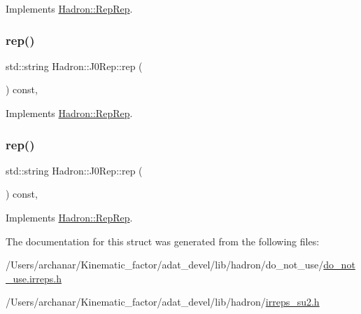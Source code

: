 Implements \mbox{\hyperlink{structHadron_1_1RepRep_ab3213025f6de249f7095892109575fde}{Hadron\+::\+Rep\+Rep}}.

\mbox{\label{structHadron_1_1J0Rep_a357214188122dd0e69716a4f7ff098b1}} 
\subsubsection{\texorpdfstring{rep()}{rep()}\hspace{0.1cm}{\footnotesize\ttfamily [2/3]}}
{\footnotesize\ttfamily std\+::string Hadron\+::\+J0\+Rep\+::rep (\begin{DoxyParamCaption}{ }\end{DoxyParamCaption}) const\hspace{0.3cm}{\ttfamily [inline]}, {\ttfamily [virtual]}}



Implements \mbox{\hyperlink{structHadron_1_1RepRep_ab3213025f6de249f7095892109575fde}{Hadron\+::\+Rep\+Rep}}.

\mbox{\label{structHadron_1_1J0Rep_a357214188122dd0e69716a4f7ff098b1}} 
\subsubsection{\texorpdfstring{rep()}{rep()}\hspace{0.1cm}{\footnotesize\ttfamily [3/3]}}
{\footnotesize\ttfamily std\+::string Hadron\+::\+J0\+Rep\+::rep (\begin{DoxyParamCaption}{ }\end{DoxyParamCaption}) const\hspace{0.3cm}{\ttfamily [inline]}, {\ttfamily [virtual]}}



Implements \mbox{\hyperlink{structHadron_1_1RepRep_ab3213025f6de249f7095892109575fde}{Hadron\+::\+Rep\+Rep}}.



The documentation for this struct was generated from the following files\+:\begin{DoxyCompactItemize}
\item 
/\+Users/archanar/\+Kinematic\+\_\+factor/adat\+\_\+devel/lib/hadron/do\+\_\+not\+\_\+use/\mbox{\hyperlink{do__not__use_8irreps_8h}{do\+\_\+not\+\_\+use.\+irreps.\+h}}\item 
/\+Users/archanar/\+Kinematic\+\_\+factor/adat\+\_\+devel/lib/hadron/\mbox{\hyperlink{lib_2hadron_2irreps__su2_8h}{irreps\+\_\+su2.\+h}}\end{DoxyCompactItemize}
